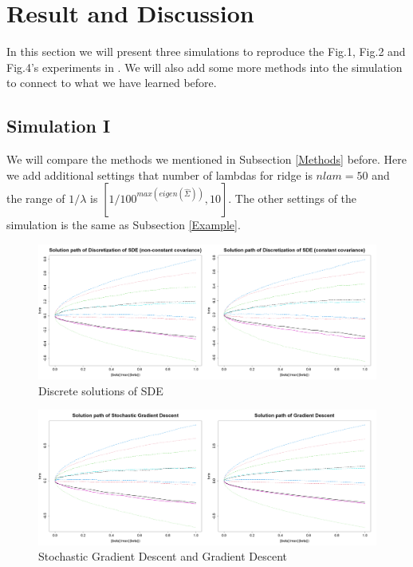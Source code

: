 \documentclass[11pt]{article}
\begin{document}
\newpage

\section{Result and Discussion} \label{Results}

In this section we will present three simulations to reproduce the Fig.1, Fig.2 and Fig.4's experiments in \cite{ali2020implicit}. We will also add some more methods into the simulation to connect to what we have learned before.

\subsection{Simulation I}

We will compare the methods we mentioned in Subsection \ref{Methods} before. Here we add additional settings that number of lambdas for ridge is $nlam=50$ and the range of $1/\lambda$ is $[1/100^{max(eigen(\hat{\Sigma}))}, 10]$. The other settings of the simulation is the same as Subsection \ref{Example}. 

\begin{figure}[h]
\centering
\includegraphics[width=1\linewidth]{fig3.png}
\caption{Discrete solutions of SDE}
\label{fig:Discrete_sde}
\end{figure}

\begin{figure}[h]
\centering
\includegraphics[width=1\linewidth]{fig4.png}
\caption{Stochastic Gradient Descent and Gradient Descent}
\label{fig:gd}
\end{figure}
\end{document}
